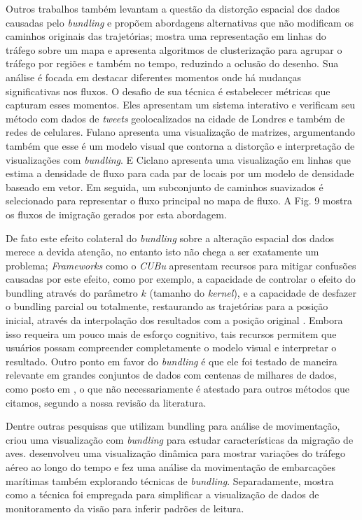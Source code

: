 Outros trabalhos também levantam a questão da distorção espacial dos dados 
causadas pelo \emph{bundling} e propõem abordagens alternativas 
que não modificam os caminhos originais das trajetórias;
\citet{Landersberg2016} mostra uma representação em linhas do tráfego sobre um
mapa e apresenta algoritmos de clusterização para agrupar o tráfego por regiões
e também no tempo, reduzindo a oclusão do desenho. Sua análise é focada em
destacar diferentes momentos onde há mudanças significativas nos fluxos. O
desafio de sua técnica é estabelecer métricas que capturam esses momentos.  Eles
apresentam um sistema interativo e verificam seu método com dados de
\emph{tweets} geolocalizados na cidade de Londres e também de redes de
celulares. Fulano apresenta uma visualização de matrizes, argumentando também
que esse é um modelo visual que contorna a distorção e interpretação de
visualizações com \emph{bundling}. E Ciclano apresenta uma visualização em
linhas que estima a densidade de fluxo para cada par de locais por um modelo de
densidade baseado em vetor. Em seguida, um subconjunto de caminhos suavizados é
selecionado para representar o fluxo principal no mapa de fluxo. A Fig. 9 mostra
os fluxos de imigração gerados por esta abordagem.

De fato este efeito colateral do \emph{bundling} sobre a alteração espacial dos
dados merece a devida atenção, no entanto isto não chega a ser exatamente um
problema; \emph{Frameworks} como o \emph{CUBu} apresentam recursos para mitigar
confusões causadas por este efeito, como por exemplo, a capacidade de controlar
o efeito do bundling  através do parâmetro $k$ (tamanho do \emph{kernel}), e a
capacidade de desfazer o bundling parcial ou totalmente, restaurando as
trajetórias para a posição inicial, através da interpolação dos resultados com a
posição original \citep{zwan:16}. Embora isso requeira um pouco mais de
esforço cognitivo, tais recursos permitem que usuários possam compreender
completamente o modelo visual e interpretar o resultado. Outro ponto em favor do
\emph{bundling} é que ele foi testado de maneira relevante em grandes conjuntos
de dados com centenas de milhares de dados, como posto em \citet{Telea2018,
Lhuillier2017}, o que não necessariamente é atestado para outros métodos que
citamos, segundo a nossa revisão da literatura.

Dentre outras pesquisas que utilizam bundling para análise de movimentação,
\citet{Anita2017} criou uma visualização com \emph{bundling} para
estudar características da migração de aves. \citet{Klein2014} desenvolveu uma
visualização dinâmica para mostrar variações do tráfego aéreo ao longo do tempo
e \citep{Willems2009} fez uma análise da movimentação de embarcações marítimas
também explorando técnicas de \emph{bundling}. Separadamente,
\citep{Blascheck2017} mostra como a técnica foi empregada para simplificar a
visualização de dados de monitoramento da visão para inferir padrões de leitura.

